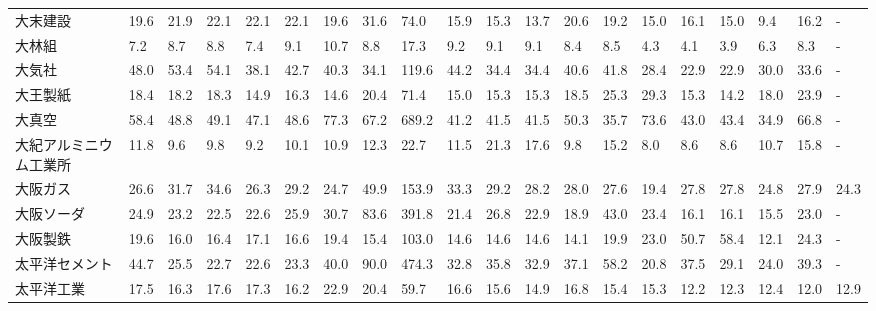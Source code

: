 \begin{tabular}{llllllllllllllllllll}
大末建設            &   19.6 &   21.9 &      22.1 &      22.1 &       22.1 &    19.6 &    31.6 &     74.0 &    15.9 &    15.3 &   13.7 &   20.6 &    19.2 &    15.0 &    16.1 &   15.0 &    9.4 &    16.2 &      - \\
大林組             &    7.2 &    8.7 &       8.8 &       7.4 &        9.1 &    10.7 &     8.8 &     17.3 &     9.2 &     9.1 &    9.1 &    8.4 &     8.5 &     4.3 &     4.1 &    3.9 &    6.3 &     8.3 &      - \\
大気社             &   48.0 &   53.4 &      54.1 &      38.1 &       42.7 &    40.3 &    34.1 &    119.6 &    44.2 &    34.4 &   34.4 &   40.6 &    41.8 &    28.4 &    22.9 &   22.9 &   30.0 &    33.6 &      - \\
大王製紙            &   18.4 &   18.2 &      18.3 &      14.9 &       16.3 &    14.6 &    20.4 &     71.4 &    15.0 &    15.3 &   15.3 &   18.5 &    25.3 &    29.3 &    15.3 &   14.2 &   18.0 &    23.9 &      - \\
大真空             &   58.4 &   48.8 &      49.1 &      47.1 &       48.6 &    77.3 &    67.2 &    689.2 &    41.2 &    41.5 &   41.5 &   50.3 &    35.7 &    73.6 &    43.0 &   43.4 &   34.9 &    66.8 &      - \\
大紀アルミニウム工業所     &   11.8 &    9.6 &       9.8 &       9.2 &       10.1 &    10.9 &    12.3 &     22.7 &    11.5 &    21.3 &   17.6 &    9.8 &    15.2 &     8.0 &     8.6 &    8.6 &   10.7 &    15.8 &      - \\
大阪ガス            &   26.6 &   31.7 &      34.6 &      26.3 &       29.2 &    24.7 &    49.9 &    153.9 &    33.3 &    29.2 &   28.2 &   28.0 &    27.6 &    19.4 &    27.8 &   27.8 &   24.8 &    27.9 &   24.3 \\
大阪ソーダ           &   24.9 &   23.2 &      22.5 &      22.6 &       25.9 &    30.7 &    83.6 &    391.8 &    21.4 &    26.8 &   22.9 &   18.9 &    43.0 &    23.4 &    16.1 &   16.1 &   15.5 &    23.0 &      - \\
大阪製鉄            &   19.6 &   16.0 &      16.4 &      17.1 &       16.6 &    19.4 &    15.4 &    103.0 &    14.6 &    14.6 &   14.6 &   14.1 &    19.9 &    23.0 &    50.7 &   58.4 &   12.1 &    24.3 &      - \\
太平洋セメント         &   44.7 &   25.5 &      22.7 &      22.6 &       23.3 &    40.0 &    90.0 &    474.3 &    32.8 &    35.8 &   32.9 &   37.1 &    58.2 &    20.8 &    37.5 &   29.1 &   24.0 &    39.3 &      - \\
太平洋工業           &   17.5 &   16.3 &      17.6 &      17.3 &       16.2 &    22.9 &    20.4 &     59.7 &    16.6 &    15.6 &   14.9 &   16.8 &    15.4 &    15.3 &    12.2 &   12.3 &   12.4 &    12.0 &   12.9 \\

\end{tabular}

